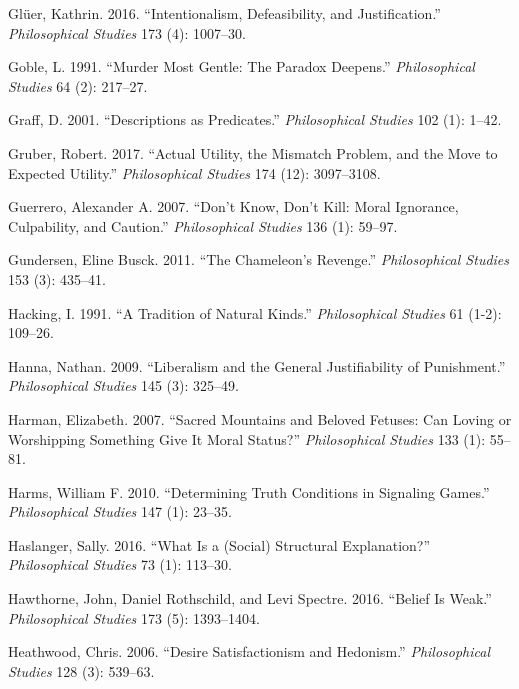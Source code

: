 \documentclass[
  10pt,
  letterpaper,
  DIV=11,
  numbers=noendperiod,
  twoside]{scrartcl}
\newlength{\cslhangindent}
\newenvironment{CSLReferences}[2] %
 {\begin{list}{}{%
  \setlength{\itemindent}{0pt}
  \setlength{\leftmargin}{0pt}
  \setlength{\parsep}{0pt}
  \ifodd #1
   \setlength{\leftmargin}{\cslhangindent}
   \setlength{\itemindent}{-1\cslhangindent}
  \fi
  \setlength{\itemsep}{#2\baselineskip}}}
 {\end{list}}
\begin{document}
\begin{CSLReferences}{1}{0}
Glüer, Kathrin. 2016. {``Intentionalism, Defeasibility, and
Justification.''} \emph{Philosophical Studies} 173 (4): 1007--30.

Goble, L. 1991. {``Murder Most Gentle: The Paradox Deepens.''}
\emph{Philosophical Studies} 64 (2): 217--27.

Graff, D. 2001. {``Descriptions as Predicates.''} \emph{Philosophical
Studies} 102 (1): 1--42.

Gruber, Robert. 2017. {``Actual Utility, the Mismatch Problem, and the
Move to Expected Utility.''} \emph{Philosophical Studies} 174 (12):
3097--3108.

Guerrero, Alexander A. 2007. {``Don't Know, Don't Kill: Moral Ignorance,
Culpability, and Caution.''} \emph{Philosophical Studies} 136 (1):
59--97.

Gundersen, Eline Busck. 2011. {``The Chameleon's Revenge.''}
\emph{Philosophical Studies} 153 (3): 435--41.

Hacking, I. 1991. {``A Tradition of Natural Kinds.''}
\emph{Philosophical Studies} 61 (1-2): 109--26.

Hanna, Nathan. 2009. {``Liberalism and the General Justifiability of
Punishment.''} \emph{Philosophical Studies} 145 (3): 325--49.

Harman, Elizabeth. 2007. {``Sacred Mountains and Beloved Fetuses: Can
Loving or Worshipping Something Give It Moral Status?''}
\emph{Philosophical Studies} 133 (1): 55--81.

Harms, William F. 2010. {``Determining Truth Conditions in Signaling
Games.''} \emph{Philosophical Studies} 147 (1): 23--35.

Haslanger, Sally. 2016. {``What Is a (Social) Structural Explanation?''}
\emph{Philosophical Studies} 73 (1): 113--30.

Hawthorne, John, Daniel Rothschild, and Levi Spectre. 2016. {``Belief Is
Weak.''} \emph{Philosophical Studies} 173 (5): 1393--1404.

Heathwood, Chris. 2006. {``Desire Satisfactionism and Hedonism.''}
\emph{Philosophical Studies} 128 (3): 539--63.


\end{CSLReferences}
\end{document}
